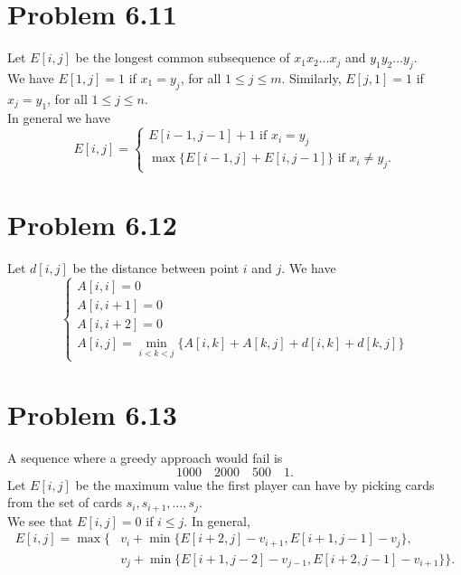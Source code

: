 \documentclass[12pt]{report}
\begin{document}
\section{Problem 6.11}
Let $E[i,j]$ be the longest common subsequence of $x_1 x_2 \ldots x_j$ and $y_1 y_2 \ldots y_j$. \\
We have $E[1,j] = 1$ if $x_1 = y_j$, for all $1 \le j \le m$. Similarly, $E[j,1] = 1$ if $x_j = y_1$, for all $1 \le j \le n$. \\
In general we have $$E[i,j] = \begin{cases} E[i-1,j-1] + 1 \text{ if } x_i = y_j \\ \max \{E[i-1,j] + E[i,j-1] \} \text{ if } x_i \ne y_j. \end{cases}$$

\section{Problem 6.12}
Let $d[i,j]$ be the distance between point $i$ and $j$. We have $$\begin{cases} A[i,i] = 0 \\ A[i, i + 1] = 0 \\ A[i, i+2] = 0 \\ A[i,j] = \displaystyle \min_{i < k < j} \{ A[i,k] + A[k,j] + d[i,k] + d[k,j]\} \end{cases}$$

\section{Problem 6.13}
A sequence where a greedy approach would fail is $$1000 \quad 2000 \quad 500 \quad 1.$$
Let $E[i,j]$ be the maximum value the first player can have by picking cards from the set of cards $s_i, s_{i+1}, \ldots, s_j$. \\
We see that $E[i,j] = 0$ if $i \le j$. In general, $$\begin{aligned} E[i,j] = \max\{ & v_i + \min \{ E[i + 2, j] - v_{i+1}, E[i + 1, j - 1] - v_j \}, \\ & v_j + \min \{ E[i+1,j-2] - v_{j-1}, E[i+2,j-1] - v_{i+1}\}\}. \end{aligned}$$
\end{document}
